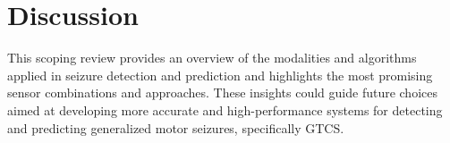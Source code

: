 \section{Discussion}

This scoping review provides an overview of the modalities and algorithms applied in seizure detection and prediction and highlights the most promising sensor combinations and approaches. These insights could guide future choices aimed at developing more accurate and high-performance systems for detecting and predicting generalized motor seizures, specifically GTCS.




